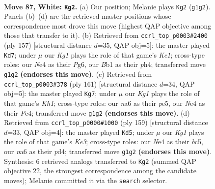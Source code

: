 \documentclass[11pt]{article}
\begin{document}
\clearpage

\begin{figure}[p]\centering
\begin{subfigure}{0.46\textwidth}\centering
\resizebox{\linewidth}{!}{%
\newchessgame
\chessboard[
  setfen={5r2/5p2/nk4p1/4P2p/4NPp1/8/7P/1B1b2K1 w - - 32 87},
  showmover=false,
  pgfstyle=straightmove, color=movearrow, markmove={g1-g2}
]}
\caption{}
\end{subfigure}\hfill
\begin{subfigure}{0.46\textwidth}\centering
\resizebox{\linewidth}{!}{%
\newchessgame
\chessboard[
  setfen={4k3/5p2/4pPp1/4P3/2pP1K1P/2P5/1B6/3b4 b - - 68 79},
  showmover=false,
  pgfstyle=straightmove, color=movearrow, markmove={e8-d7}
]}
\caption{}
\end{subfigure}
\\[4pt]
\begin{subfigure}{0.46\textwidth}\centering
\resizebox{\linewidth}{!}{%
\newchessgame
\chessboard[
  setfen={7k/8/3K4/1p1pP3/1PpP2P1/2P2b2/pB6/8 b - - 2 81},
  showmover=false,
  pgfstyle=straightmove, color=movearrow, markmove={h8-g7}
]}
\caption{}
\end{subfigure}\hfill
\begin{subfigure}{0.46\textwidth}\centering
\resizebox{\linewidth}{!}{%
\newchessgame
\chessboard[
  setfen={8/1p6/p3k3/P1B2p1p/3P3P/4K1Pb/8/8 b - - 6 80},
  showmover=false,
  pgfstyle=straightmove, color=movearrow, markmove={e6-d5}
]}
\caption{}
\end{subfigure}
\caption{\textbf{Move 87, White: \texttt{Kg2}.} (a) Our position; Melanie plays \texttt{Kg2} (\texttt{g1g2}). Panels (b)--(d) are the retrieved master positions whose correspondence most drove this move (highest QAP objective among those that transfer to it). (b) Retrieved from \texttt{ccrl\_top\_p0003\#2400} (ply 157) [structural distance $d$=35, QAP obj=5]: the master played \texttt{Kd7}; under $\mu$ our \emph{Kg1} plays the role of that game's \emph{Ke1}; cross-type roles: our \emph{N}e4 as their \emph{P}g6, our \emph{B}b1 as their \emph{p}h4; transferred move \texttt{g1g2} \textbf{(endorses this move)}. (c) Retrieved from \texttt{ccrl\_top\_p0003\#378} (ply 161) [structural distance $d$=34, QAP obj=5]: the master played \texttt{Kg7}; under $\mu$ our \emph{Kg1} plays the role of that game's \emph{Kh1}; cross-type roles: our \emph{n}a6 as their \emph{p}e5, our \emph{N}e4 as their \emph{P}c4; transferred move \texttt{g1g2} \textbf{(endorses this move)}. (d) Retrieved from \texttt{ccrl\_top\_p0000\#1000} (ply 159) [structural distance $d$=33, QAP obj=4]: the master played \texttt{Kd5}; under $\mu$ our \emph{Kg1} plays the role of that game's \emph{Ke3}; cross-type roles: our \emph{N}e4 as their \emph{b}c5, our \emph{n}a6 as their \emph{p}d4; transferred move \texttt{g1g2} \textbf{(endorses this move)}. Synthesis: 6 retrieved analogs transferred to \texttt{Kg2} (summed QAP objective 22, the strongest correspondence among the candidate moves); Melanie committed it via the \texttt{search} selector.}
\label{fig:thought-m172}
\end{figure}
\end{document}
